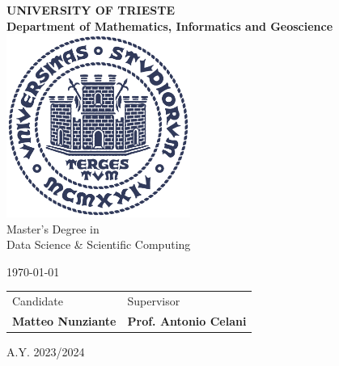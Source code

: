 
\begin{titlepage}
    \begin{center}
    \AddToShipoutPicture{\BackgroundPicFront}
    {\LARGE {\bfseries UNIVERSITY OF TRIESTE \\}}
    \vspace{5mm}
    {\Large {\bfseries Department of Mathematics, Informatics and Geoscience \\}}
    \vspace{1cm}
    \includegraphics[width=6cm,height=6cm]{images/units_logo.png}\\[1cm]

    {\LARGE
        Master's Degree in\\ Data Science \& Scientific Computing \\
    }
    \vspace{1cm}
    {\LARGE 
        {\bfseries \thetitle} %
    }
    \vspace{1cm}

    {\large \today \\[1cm]
    }

        {\large
            \setlength{\tabcolsep}{12pt}
            \begin{tabularx}{\linewidth}{ >{\raggedleft}X >{\raggedright\arraybackslash}X}
                Candidate & Supervisor \\
                \bfseries Matteo Nunziante & \bfseries Prof. Antonio Celani \\ [2cm] 
            \end{tabularx}
        }
    A.Y. 2023/2024
    \end{center}
\end{titlepage}

